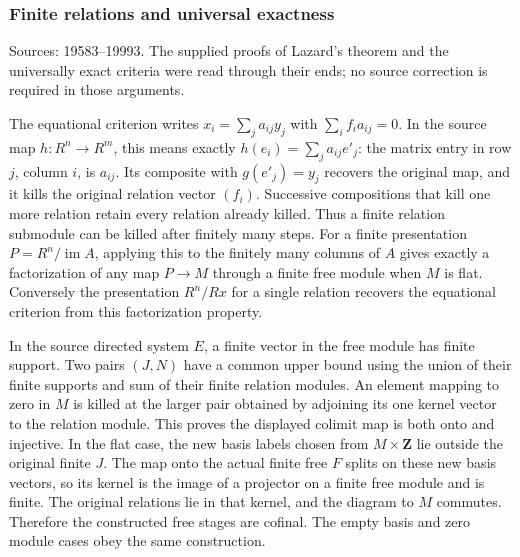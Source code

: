 \subsubsection{Finite relations and universal exactness}\label{algebra-proof-010-finite-relations-and-universal-exactness}

Sources: 19583--19993. The supplied proofs of Lazard's theorem and the universally exact criteria were read through their ends; no source correction is required in those arguments.

The equational criterion writes \(x_i=\sum_j a_{ij}y_j\) with \(\sum_i f_i a_{ij}=0\). In the source map \(h:R^n\to R^m\), this means exactly \(h(e_i)=\sum_j a_{ij}e'_j\): the matrix entry in row \(j\), column \(i\), is \(a_{ij}\). Its composite with \(g(e'_j)=y_j\) recovers the original map, and it kills the original relation vector \((f_i)\). Successive compositions that kill one more relation retain every relation already killed. Thus a finite relation submodule can be killed after finitely many steps. For a finite presentation \(P=R^n/\operatorname{im}A\), applying this to the finitely many columns of \(A\) gives exactly a factorization of any map \(P\to M\) through a finite free module when \(M\) is flat. Conversely the presentation \(R^n/Rx\) for a single relation recovers the equational criterion from this factorization property.

In the source directed system \(E\), a finite vector in the free module has finite support. Two pairs \((J,N)\) have a common upper bound using the union of their finite supports and sum of their finite relation modules. An element mapping to zero in \(M\) is killed at the larger pair obtained by adjoining its one kernel vector to the relation module. This proves the displayed colimit map is both onto and injective. In the flat case, the new basis labels chosen from \(M\times\mathbf Z\) lie outside the original finite \(J\). The map onto the actual finite free \(F\) splits on these new basis vectors, so its kernel is the image of a projector on a finite free module and is finite. The original relations lie in that kernel, and the diagram to \(M\) commutes. Therefore the constructed free stages are cofinal. The empty basis and zero module cases obey the same construction.

